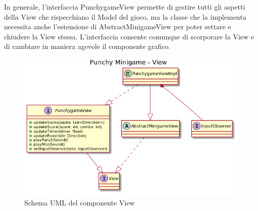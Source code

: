 \documentclass[a4paper,12pt]{report}
\begin{document}
	In generale, l'interfaccia PunchygameView permette di gestire tutti gli aspetti della View che rispecchiano il Model del gioco, ma la classe che la implementa necessita anche l'estensione di AbstractMinigameView per poter settare e chiudere la View stessa.
    L'interfaccia consente comunque di scorporare la View e di cambiare in maniera agevole il componente grafico.\newline
    \begin{figure}[h]
        \centering{}
        \includegraphics[width=150mm]{images/picchiotti/punchyview.png}
        \caption{Schema UML del componente View}
        \label{img:punchyview}
    \end{figure}
\end{document}
